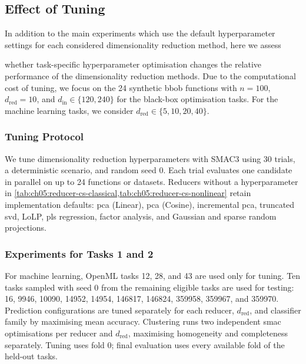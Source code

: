 \subsection{Effect of Tuning}

In addition to the main experiments which use the default hyperparameter settings for each considered dimensionality reduction method, here we assess

whether task-specific hyperparameter optimisation changes the relative performance of the dimensionality reduction methods. Due to the computational cost of tuning, we focus on the 24 synthetic \gls{bbob} functions with \(n=100\), \(d_{\mathrm{red}}=10\), and \(d_{\mathrm{in}}\in\{120,240\}\) for the black-box optimisation tasks. For the machine learning tasks, we consider \(d_{\mathrm{red}}\in\{5,10,20,40\}\).

\subsubsection{Tuning Protocol}
\label{app:ch05:cs}
\label{app:ch05:tuning-protocol}

We tune dimensionality reduction hyperparameters with SMAC3 using 30 trials, a deterministic scenario, and random seed 0. Each trial evaluates one candidate in parallel on up to 24 functions or datasets. Reducers without a hyperparameter in \cref{tab:ch05:reducer-cs-classical,tab:ch05:reducer-cs-nonlinear} retain implementation defaults: \gls{pca} (Linear), \gls{pca} (Cosine), incremental \gls{pca}, truncated \gls{svd}, LoLP, \gls{pls} regression, factor analysis, and Gaussian and sparse random projections.

\subsubsection{Experiments for Tasks 1 and 2}

For machine learning, OpenML tasks 12, 28, and 43 are used only for tuning. Ten tasks sampled with seed 0 from the remaining eligible tasks are used for testing: 16, 9946, 10090, 14952, 14954, 146817, 146824, 359958, 359967, and 359970. Prediction configurations are tuned separately for each reducer, \(d_{\mathrm{red}}\), and classifier family by maximising mean accuracy. Clustering runs two independent \gls{smac} optimisations per reducer and \(d_{\mathrm{red}}\), maximising homogeneity and completeness separately. Tuning uses fold 0; final evaluation uses every available fold of the held-out tasks.

